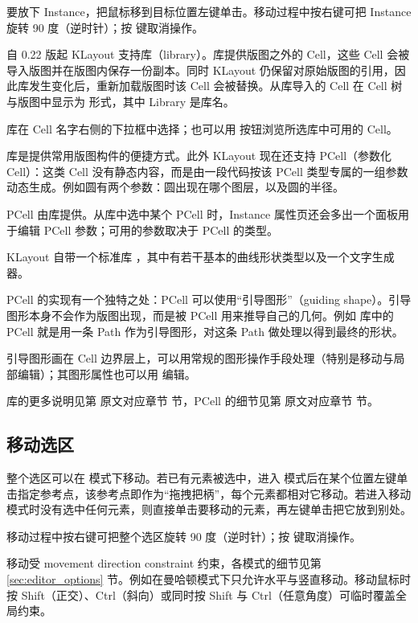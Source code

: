 要放下 Instance，把鼠标移到目标位置左键单击。移动过程中按右键可把 Instance 旋转 90 度（逆时针）；按  键取消操作。

自 0.22 版起 KLayout 支持库（library）。库提供版图之外的 Cell，这些 Cell 会被导入版图并在版图内保存一份副本。同时 KLayout 仍保留对原始版图的引用，因此库发生变化后，重新加载版图时该 Cell 会被替换。从库导入的 Cell 在 Cell 树与版图中显示为  形式，其中 Library 是库名。

库在 Cell 名字右侧的下拉框中选择；也可以用  按钮浏览所选库中可用的 Cell。

库是提供常用版图构件的便捷方式。此外 KLayout 现在还支持 PCell（参数化 Cell）：这类 Cell 没有静态内容，而是由一段代码按该 PCell 类型专属的一组参数动态生成。例如圆有两个参数：圆出现在哪个图层，以及圆的半径。

PCell 由库提供。从库中选中某个 PCell 时，Instance 属性页还会多出一个面板用于编辑 PCell 参数；可用的参数取决于 PCell 的类型。

KLayout 自带一个标准库 ，其中有若干基本的曲线形状类型以及一个文字生成器。

PCell 的实现有一个独特之处：PCell 可以使用“引导图形”（guiding shape）。引导图形本身不会作为版图出现，而是被 PCell 用来推导自己的几何。例如  库中的  PCell 就是用一条 Path 作为引导图形，对这条 Path 做处理以得到最终的形状。

引导图形画在 Cell 边界层上，可以用常规的图形操作手段处理（特别是移动与局部编辑）；其图形属性也可以用  编辑。

库的更多说明见第 原文对应章节 节，PCell 的细节见第 原文对应章节 节。

\subsection{移动选区}\label{sec:move_sel}

整个选区可以在  模式下移动。若已有元素被选中，进入  模式后在某个位置左键单击指定参考点，该参考点即作为“拖拽把柄”，每个元素都相对它移动。若进入移动模式时没有选中任何元素，则直接单击要移动的元素，再左键单击把它放到别处。

移动过程中按右键可把整个选区旋转 90 度（逆时针）；按  键取消操作。

移动受 movement direction constraint 约束，各模式的细节见第 \ref{sec:editor_options} 节。例如在曼哈顿模式下只允许水平与竖直移动。移动鼠标时按 Shift（正交）、Ctrl（斜向）或同时按 Shift 与 Ctrl（任意角度）可临时覆盖全局约束。

